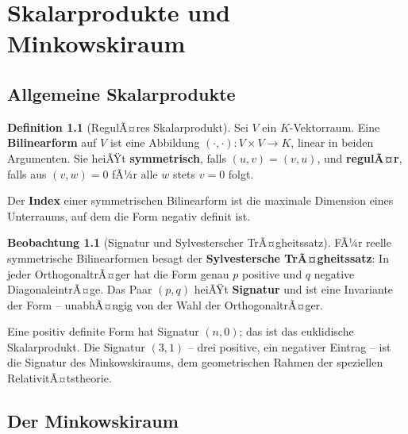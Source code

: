 ﻿\documentclass[a4paper,12pt]{report}
\theoremstyle{definition}
\newtheorem{definition}{Definition}
\newtheorem{beobachtung}{Beobachtung}
\begin{document}
\chapter{Skalarprodukte und Minkowskiraum}

\section{Allgemeine Skalarprodukte}

\begin{definition}[RegulÃ¤res Skalarprodukt]
    Sei $V$ ein $K$-Vektorraum. Eine \textbf{Bilinearform} auf $V$ ist
    eine Abbildung $(\cdot, \cdot) : V \times V \to K$, linear in beiden
    Argumenten. Sie heiÃŸt \textbf{symmetrisch}, falls $(u,v) = (v,u)$,
    und \textbf{regulÃ¤r}, falls aus $(v, w) = 0$ fÃ¼r alle $w$ stets
    $v = 0$ folgt.

    Der \textbf{Index} einer symmetrischen Bilinearform ist die maximale
    Dimension eines Unterraums, auf dem die Form negativ definit ist.
\end{definition}

\begin{beobachtung}[Signatur und Sylvesterscher TrÃ¤gheitssatz]
    FÃ¼r reelle symmetrische Bilinearformen besagt der \textbf{Sylvestersche
    TrÃ¤gheitssatz}: In jeder OrthogonaltrÃ¤ger hat die Form genau
    $p$ positive und $q$ negative DiagonaleintrÃ¤ge. Das Paar $(p,q)$
    heiÃŸt \textbf{Signatur} und ist eine Invariante der Form -- unabhÃ¤ngig
    von der Wahl der OrthogonaltrÃ¤ger.

    Eine positiv definite Form hat Signatur $(n, 0)$; das ist das
    euklidische Skalarprodukt. Die Signatur $(3, 1)$ -- drei positive,
    ein negativer Eintrag -- ist die Signatur des Minkowskiraums,
    dem geometrischen Rahmen der speziellen RelativitÃ¤tstheorie.
\end{beobachtung}

\section{Der Minkowskiraum}
\end{document}
